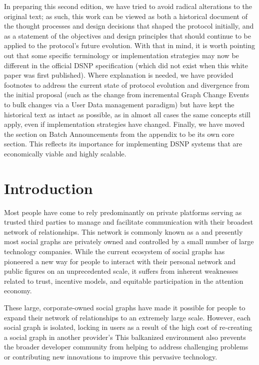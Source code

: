 \documentclass[12pt,letterpaper]{article}
\begin{document}
In preparing this second edition, we have tried to avoid radical alterations to the original
text; as such, this work can be viewed as both a historical document of the thought
processes and design decisions that shaped the protocol initially, and as a statement of the
objectives and design principles that should continue to be applied to the protocol's future
evolution. With that in mind, it is worth pointing out that some specific terminology or
implementation strategies may now be different in the official DSNP specification (which did
not exist when this white paper was first published). Where explanation is needed, we have
provided footnotes to address the current state of protocol evolution and divergence from
the initial proposal (such as the change from incremental Graph Change Events to bulk
changes via a User Data management paradigm) but have kept the historical text as intact as
possible, as in almost all cases the same concepts still apply, even if implementation
strategies have changed. Finally, we have moved the section on Batch Announcements from the
appendix to be its own core section. This reflects its importance for implementing DSNP
systems that are economically viable and highly scalable.

\clearpage
\section{Introduction}\label{sec:introduction}

Most people have come to rely predominantly on private platforms serving as trusted third
parties to manage and facilitate communication with their broadest network of
relationships. This network is commonly known as a  and presently most
social graphs are privately owned and controlled by a small number of large technology
companies. While the current ecosystem of social graphs has pioneered a new way for people
to interact with their personal network and public figures on an unprecedented scale, it
suffers from inherent weaknesses related to trust, incentive models, and equitable
participation in the attention economy.

These large, corporate-owned social graphs have made it possible for people to expand
their network of relationships to an extremely large scale. However, each social graph is
isolated, locking in users as a result of the high cost of re-creating a social graph in
another provider's  This balkanized environment also prevents the
broader developer community from helping to address challenging problems or contributing
new innovations to improve this pervasive technology.
\end{document}
